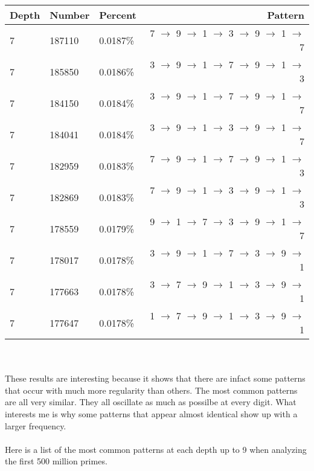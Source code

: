 \documentclass[13pt]{article}
\begin{document}
\begin{tabular}{ l l l r }
  Depth & Number & Percent & Pattern \\
  \hline
  7 & 187110 & 0.0187\% & 7 $\rightarrow$ 9 $\rightarrow$ 1 $\rightarrow$ 3 $\rightarrow$ 9 $\rightarrow$ 1 $\rightarrow$ 7\\
  7 & 185850 & 0.0186\% & 3 $\rightarrow$ 9 $\rightarrow$ 1 $\rightarrow$ 7 $\rightarrow$ 9 $\rightarrow$ 1 $\rightarrow$ 3\\
  7 & 184150 & 0.0184\% & 3 $\rightarrow$ 9 $\rightarrow$ 1 $\rightarrow$ 7 $\rightarrow$ 9 $\rightarrow$ 1 $\rightarrow$ 7\\
  7 & 184041 & 0.0184\% & 3 $\rightarrow$ 9 $\rightarrow$ 1 $\rightarrow$ 3 $\rightarrow$ 9 $\rightarrow$ 1 $\rightarrow$ 7\\
  7 & 182959 & 0.0183\% & 7 $\rightarrow$ 9 $\rightarrow$ 1 $\rightarrow$ 7 $\rightarrow$ 9 $\rightarrow$ 1 $\rightarrow$ 3\\
  7 & 182869 & 0.0183\% & 7 $\rightarrow$ 9 $\rightarrow$ 1 $\rightarrow$ 3 $\rightarrow$ 9 $\rightarrow$ 1 $\rightarrow$ 3\\
  7 & 178559 & 0.0179\% & 9 $\rightarrow$ 1 $\rightarrow$ 7 $\rightarrow$ 3 $\rightarrow$ 9 $\rightarrow$ 1 $\rightarrow$ 7\\
  7 & 178017 & 0.0178\% & 3 $\rightarrow$ 9 $\rightarrow$ 1 $\rightarrow$ 7 $\rightarrow$ 3 $\rightarrow$ 9 $\rightarrow$ 1\\
  7 & 177663 & 0.0178\% & 3 $\rightarrow$ 7 $\rightarrow$ 9 $\rightarrow$ 1 $\rightarrow$ 3 $\rightarrow$ 9 $\rightarrow$ 1\\
  7 & 177647 & 0.0178\% & 1 $\rightarrow$ 7 $\rightarrow$ 9 $\rightarrow$ 1 $\rightarrow$ 3 $\rightarrow$ 9 $\rightarrow$ 1\\
  \end{tabular}\\\\
  These results are interesting because it shows that there are infact some patterns that occur with much more regularity than others. The most common patterns are all very similar. They all oscillate as much as possilbe at every digit. What interests me is why some patterns that appear almost identical show up with a larger frequency. \\\\
  Here is a list of the most common patterns at each depth up to 9 when analyzing the first 500 million primes. \\\\
\end{document}
